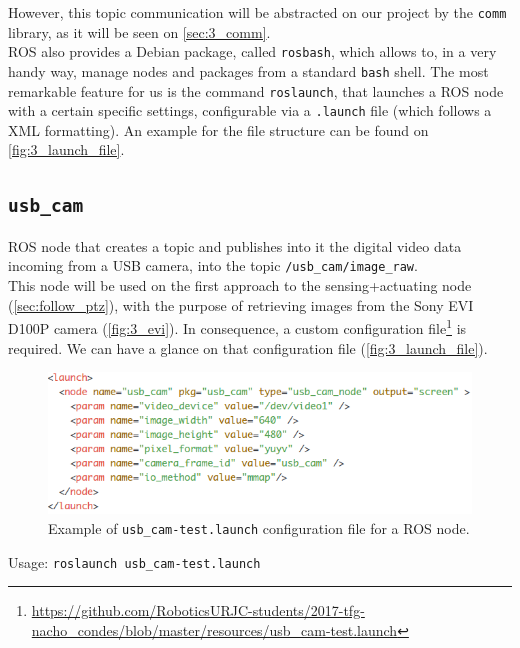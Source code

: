 	However, this topic communication will be abstracted on our project by the \texttt{comm} library, as it will be seen on \autoref{sec:3_comm}.\\
	
	ROS also provides a Debian package, called \texttt{rosbash}, which allows to, in a very handy way, manage nodes and packages from a standard \texttt{bash} shell. The most remarkable feature for us is the command \texttt{roslaunch}, that launches a ROS node with a certain specific settings, configurable via a \texttt{.launch} file (which follows a XML formatting). An example for the file structure can be found on \autoref{fig:3_launch_file}.\\
	
	\subsection{\texttt{usb\_cam}}
	\label{sec:3_usb_cam}
		ROS node that creates a topic and publishes into it the digital video data incoming from a USB camera, into the topic \texttt{/usb\_cam/image\_raw}.\\
		
		This node will be used on the first approach to the sensing+actuating node (\autoref{sec:follow_ptz}), with the purpose of retrieving images from the Sony EVI D100P camera (\autoref{fig:3_evi}). In consequence, a custom configuration file\footnote{\url{https://github.com/RoboticsURJC-students/2017-tfg-nacho\_condes/blob/master/resources/usb\_cam-test.launch}} is required. We can have a glance on that configuration file (\autoref{fig:3_launch_file}).\\
		
		\begin{figure}[h]
			\centering
			\includegraphics[width=5in]{images/usb_cam_test}
			\caption{Example of \texttt{usb\_cam-test.launch} configuration file for a ROS node.}
			\label{fig:3_launch_file}
		\end{figure}
		\begin{center}
			Usage: \texttt{roslaunch usb\_cam-test.launch}
		\end{center}


